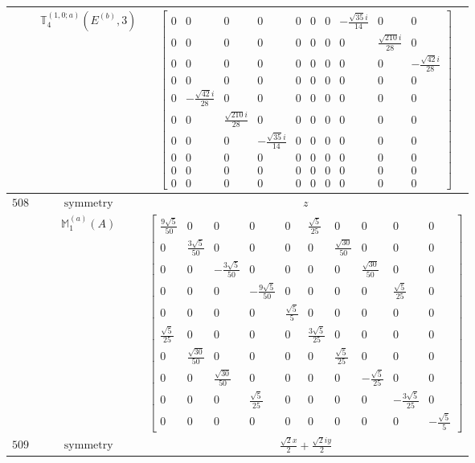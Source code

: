 \documentclass[fleqn,8pt,landscape]{jsarticle}
\begin{document}
\begin{longtable}{ccc}
$  $ & $ \mathbb{T}_{4}^{(1,0;a)}(E^{(b)},3) $ & $ \begin{bmatrix} 0 & 0 & 0 & 0 & 0 & 0 & 0 & - \frac{\sqrt{35} i}{14} & 0 & 0 \\ 0 & 0 & 0 & 0 & 0 & 0 & 0 & 0 & \frac{\sqrt{210} i}{28} & 0 \\ 0 & 0 & 0 & 0 & 0 & 0 & 0 & 0 & 0 & - \frac{\sqrt{42} i}{28} \\ 0 & 0 & 0 & 0 & 0 & 0 & 0 & 0 & 0 & 0 \\ 0 & - \frac{\sqrt{42} i}{28} & 0 & 0 & 0 & 0 & 0 & 0 & 0 & 0 \\ 0 & 0 & \frac{\sqrt{210} i}{28} & 0 & 0 & 0 & 0 & 0 & 0 & 0 \\ 0 & 0 & 0 & - \frac{\sqrt{35} i}{14} & 0 & 0 & 0 & 0 & 0 & 0 \\ 0 & 0 & 0 & 0 & 0 & 0 & 0 & 0 & 0 & 0 \\ 0 & 0 & 0 & 0 & 0 & 0 & 0 & 0 & 0 & 0 \\ 0 & 0 & 0 & 0 & 0 & 0 & 0 & 0 & 0 & 0 \end{bmatrix} $ \\ \hline
$ 508 $ & $ \text{symmetry} $ & $ z $ \\
$  $ & $ \mathbb{M}_{1}^{(a)}(A) $ & $ \begin{bmatrix} \frac{9 \sqrt{5}}{50} & 0 & 0 & 0 & 0 & \frac{\sqrt{5}}{25} & 0 & 0 & 0 & 0 \\ 0 & \frac{3 \sqrt{5}}{50} & 0 & 0 & 0 & 0 & \frac{\sqrt{30}}{50} & 0 & 0 & 0 \\ 0 & 0 & - \frac{3 \sqrt{5}}{50} & 0 & 0 & 0 & 0 & \frac{\sqrt{30}}{50} & 0 & 0 \\ 0 & 0 & 0 & - \frac{9 \sqrt{5}}{50} & 0 & 0 & 0 & 0 & \frac{\sqrt{5}}{25} & 0 \\ 0 & 0 & 0 & 0 & \frac{\sqrt{5}}{5} & 0 & 0 & 0 & 0 & 0 \\ \frac{\sqrt{5}}{25} & 0 & 0 & 0 & 0 & \frac{3 \sqrt{5}}{25} & 0 & 0 & 0 & 0 \\ 0 & \frac{\sqrt{30}}{50} & 0 & 0 & 0 & 0 & \frac{\sqrt{5}}{25} & 0 & 0 & 0 \\ 0 & 0 & \frac{\sqrt{30}}{50} & 0 & 0 & 0 & 0 & - \frac{\sqrt{5}}{25} & 0 & 0 \\ 0 & 0 & 0 & \frac{\sqrt{5}}{25} & 0 & 0 & 0 & 0 & - \frac{3 \sqrt{5}}{25} & 0 \\ 0 & 0 & 0 & 0 & 0 & 0 & 0 & 0 & 0 & - \frac{\sqrt{5}}{5} \end{bmatrix} $ \\ \hline
$ 509 $ & $ \text{symmetry} $ & $ \frac{\sqrt{2} x}{2} + \frac{\sqrt{2} i y}{2} $ \\

\end{longtable}
\end{document}
